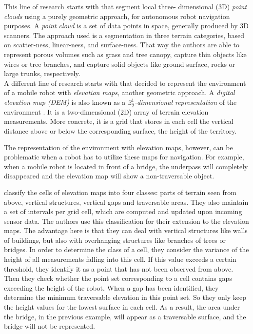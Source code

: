 \documentclass[12pt,a4paper]{report}
\newcommand{\term}{\textit}
\newcommand{\acronym}{\MakeUppercase}
\newcommand{\itfrac}[2]{\frac{\textit{#1}}{\textit{#2}}}
\begin{document}
	This line of research starts with \citet{Lalonde} that segment local three-
	dimensional (\acronym{3d}) \term{point clouds} using a purely geometric 
	approach, for autonomous robot navigation purposes. A 
	\term{point cloud} is a set of data points in space, generally produced by 
	\acronym{3d} scanners. The approach used is a segmentation in three terrain 
	categories, based on scatter-ness, linear-ness, and surface-ness. That way 
	the authors are able to represent porous volumes such as grass and tree canopy, 
	capture thin objects like wires or tree branches, and capture solid objects 
	like ground surface, rocks or large trunks, respectively.
	\\	
	
	A different line of research starts with \citet{Pfaff} that decided to represent 
	the environment of a mobile robot with \term{elevation maps}, another geometric 
	approach. A \term{digital elevation map (\acronym{dem})} \citep{Kweon} is also 
	known as a \term{2\(\itfrac{1}{2}\)-dimensional representation} of the environment 
	\citep{Pfaff}. It is a two-dimensional (\acronym{2d}) array of terrain elevation 
	measurements. More concrete, it is a grid that stores in each cell the vertical 
	distance above or below the corresponding surface, the height of the territory. 
	\par 
	The representation of the environment with elevation maps, however, can 
	be problematic when a robot has to utilize these maps for navigation. For 
	example, when a mobile robot is located in front of a bridge, the underpass will 
	completely disappeared and the elevation map will show a non-traversable 
	object.
	\par
	\citet{Pfaff} classify the cells of elevation maps into four classes: 
	parts of terrain seen from above, vertical structures, vertical gaps and 
	traversable areas. They also maintain a set of intervals per grid cell, which 
	are computed and updated upon incoming sensor data. The authors use this 
	classification for their extension to the elevation maps. The advantage here is 
	that they can deal with vertical structures like walls of buildings, but also 
	with overhanging structures like branches of trees or bridges. In order to 
	determine the class of a cell, they consider the variance of the height of all 
	measurements falling into this cell. If this value exceeds a certain threshold, 
	they identify it as a point that has not been observed from above. Then they 
	check whether the point set corresponding to a cell	contains gaps exceeding the 
	height of the robot. When a gap has been identified, they determine the	minimum 
	traversable elevation in this point set. So they only keep the height values for 
	the lowest surface in each cell. As a result, the area under the bridge, in the 
	previous example, will appear as a traversable surface, and the bridge will not 
	be represented.
	\\
	
\end{document}
